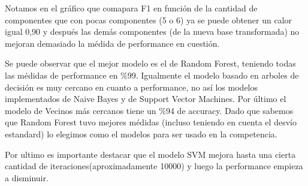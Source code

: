 \documentclass[10pt, a4paper]{article}
\begin{document}
Notamos en el gráfico que comapara F1 en función de la cantidad de componentes que con pocas componentes (5 o 6) ya se puede obtener un calor igual 0,90 y después las demás componentes (de la nueva base transformada) no mejoran demasiado la médida de performance en cuestión.

Se puede observar que el mejor modelo es el de Random Forest, teniendo todas las médidas de performance en \%99. Igualmente el modelo basado en arboles de decisión es muy cercano en cuanto a performance, no así los modelos implementados de Naive Bayes y de Support Vector Machines. Por último el modelo de Vecinos más cercanos tiene un \%94 de accuracy. Dado que sabemos que Random Forest tuvo mejores médidas (incluso teniendo en cuenta el desvío estandard) lo elegimos como el modelos para ser usado en la competencia.

Por ultimo es importante destacar que el modelo SVM mejora hasta una cierta cantidad de iteraciones(aproximadamente 10000) y luego la performance empieza a disminuir. 
\end{document}
